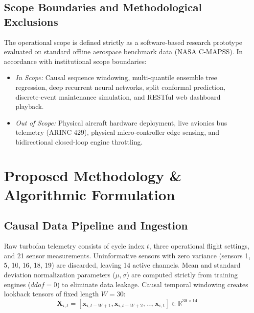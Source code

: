 \documentclass[12pt,a4paper]{article}
\begin{document}
\subsection{Scope Boundaries and Methodological Exclusions}
The operational scope is defined strictly as a software-based research prototype evaluated on standard offline aerospace benchmark data (NASA C-MAPSS). In accordance with institutional scope boundaries:
\begin{itemize}[leftmargin=1.5em]
    \item \textit{In Scope:} Causal sequence windowing, multi-quantile ensemble tree regression, deep recurrent neural networks, split conformal prediction, discrete-event maintenance simulation, and RESTful web dashboard playback.
    \item \textit{Out of Scope:} Physical aircraft hardware deployment, live avionics bus telemetry (ARINC 429), physical micro-controller edge sensing, and bidirectional closed-loop engine throttling.
\end{itemize}

\section{Proposed Methodology \& Algorithmic Formulation}

\subsection{Causal Data Pipeline and Ingestion}
Raw turbofan telemetry consists of cycle index $t$, three operational flight settings, and 21 sensor measurements. Uninformative sensors with zero variance (sensors 1, 5, 10, 16, 18, 19) are discarded, leaving 14 active channels. Mean and standard deviation normalization parameters ($\mu, \sigma$) are computed strictly from training engines ($ddof=0$) to eliminate data leakage. Causal temporal windowing creates lookback tensors of fixed length $W=30$:
\begin{equation}
    \mathbf{X}_{i,t} = [\mathbf{x}_{i,t-W+1}, \mathbf{x}_{i,t-W+2}, \dots, \mathbf{x}_{i,t}] \in \mathbb{R}^{30 \times 14}
\end{equation}
\end{document}
